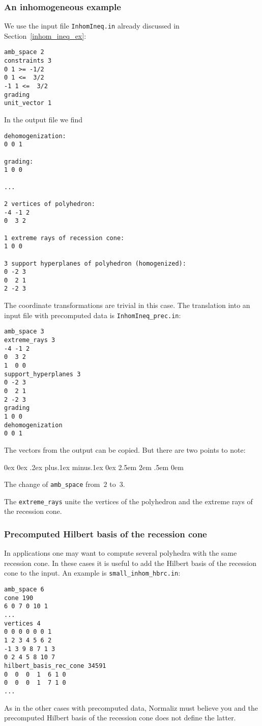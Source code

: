 \documentclass[12pt,a4paper]{scrartcl}
\newcounter{listi}
\newcommand{\stdli}{ \topsep0ex \partopsep0ex %
\parsep.2ex plus.1ex minus.1ex \itemsep0ex%
\leftmargin2.5em \labelwidth2em \labelsep.5em \rightmargin0em}%
\newenvironment{arab}{\begin{list}{\textup{(\arabic{listi})}}%
	{\usecounter{listi}\stdli}}{\end{list}}
\theoremstyle{definition}
\begin{document}
\subsubsection{An inhomogeneous example}\label{inhom_prec}
We use the input file \verb|InhomIneq.in| already discussed in Section~\ref{inhom_ineq_ex}:
\begin{Verbatim}
amb_space 2
constraints 3
0 1 >= -1/2
0 1 <=  3/2
-1 1 <=  3/2
grading
unit_vector 1
\end{Verbatim}
In the output file we find
\begin{Verbatim}
dehomogenization:
0 0 1 

grading:
1 0 0 

...

2 vertices of polyhedron:
-4 -1 2
0  3 2

1 extreme rays of recession cone:
1 0 0

3 support hyperplanes of polyhedron (homogenized):
0 -2 3
0  2 1
2 -2 3
\end{Verbatim}
The coordinate transformations are trivial in this case. The translation into an input file with precomputed data is \verb|InhomIneq_prec.in|:
\begin{Verbatim}
amb_space 3
extreme_rays 3
-4 -1 2
0  3 2
1  0 0
support_hyperplanes 3
0 -2 3
0  2 1
2 -2 3
grading
1 0 0
dehomogenization
0 0 1
\end{Verbatim}
The vectors from the output can be copied. But there are two points to note:
\begin{arab}
	\item The change of \verb|amb_space| from~$2$ to~$3$.
	\item The \verb|extreme_rays| unite the vertices of the polyhedron and the extreme rays of the recession cone.
\end{arab}


\subsubsection{Precomputed Hilbert basis of the recession cone}\label{HB_rec_cone}

In applications one may want to compute several polyhedra with the same recession cone. In these cases it is useful to add the Hilbert basis of the recession cone to the input. An example is \verb|small_inhom_hbrc.in|:
\begin{Verbatim}
amb_space 6
cone 190
6 0 7 0 10 1
...
vertices 4
0 0 0 0 0 0 1
1 2 3 4 5 6 2
-1 3 9 8 7 1 3
0 2 4 5 8 10 7
hilbert_basis_rec_cone 34591
0  0  0  1  6 1 0
0  0  0  1  7 1 0
...
\end{Verbatim}
As in the other cases with precomputed data, Normaliz must believe you and the precomputed Hilbert basis of the recession cone does not define the latter.
\end{document}
